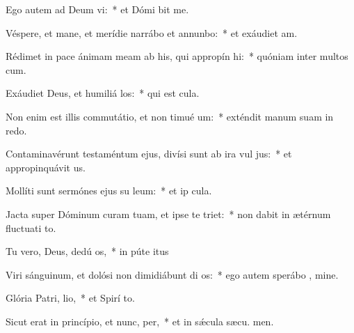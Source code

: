 \item Ego autem ad Deum vi:~* et Dómi bit me.
\item Véspere, et mane, et merídie narrábo et annunbo:~* et exáudiet  am.
\item Rédimet in pace ánimam meam ab his, qui appropín hi:~* quóniam inter multos  cum.
\item Exáudiet Deus, et humiliá los:~* qui est  cula.
\item Non enim est illis commutátio, et non timué um:~* exténdit manum suam in redo.
\item Contaminavérunt testaméntum ejus, divísi sunt ab ira vul jus:~* et appropinquávit  us.
\item Mollíti sunt sermónes ejus su leum:~* et ip  cula.
\item Jacta super Dóminum curam tuam, et ipse te triet:~* non dabit in ætérnum fluctuati to.
\item Tu vero, Deus, dedú os,~* in púte itus
\item Viri sánguinum, et dolósi non dimidiábunt di os:~* ego autem sperábo  , mine.
\item Glória Patri,  lio,~* et Spirí to.
\item Sicut erat in princípio, et nunc,  per,~* et in sǽcula sæcu. men.
